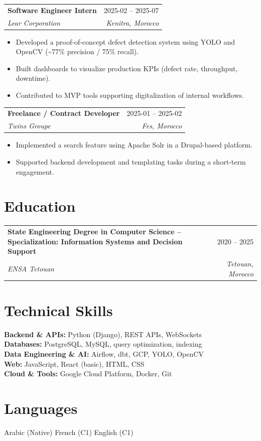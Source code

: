 \documentclass[11pt,a4paper]{article}
\makeatletter
\newcommand{\resumeEntry}[4]{
\begin{tabularx}{\textwidth}{@{}Xr@{}}
\textbf{#1} & #2 \\
\textit{#3} & \textit{#4} \\
\end{tabularx}
\vspace{-3pt}
}
\makeatother
\begin{document}
\resumeEntry
{Software Engineer Intern}
{2025-02 -- 2025-07}
{Lear Corporation}
{Kenitra, Morocco}

\begin{itemize}
  \item Developed a proof-of-concept defect detection system using YOLO and OpenCV (\textasciitilde77\% precision / 75\% recall).
  \item Built dashboards to visualize production KPIs (defect rate, throughput, downtime).
  \item Contributed to MVP tools supporting digitalization of internal workflows.
\end{itemize}

\resumeEntry
{Freelance / Contract Developer}
{2025-01 -- 2025-02}
{Twins Groupe}
{Fes, Morocco}

\begin{itemize}
  \item Implemented a search feature using Apache Solr in a Drupal-based platform.
  \item Supported backend development and templating tasks during a short-term engagement.
\end{itemize}

\section*{Education}

\resumeEntry
{State Engineering Degree in Computer Science -- Specialization: Information Systems and Decision Support}
{2020 -- 2025}
{ENSA Tetouan}
{Tetouan, Morocco}

\section*{Technical Skills}

\textbf{Backend \& APIs:} Python (Django), REST APIs, WebSockets \\
\textbf{Databases:} PostgreSQL, MySQL, query optimization, indexing \\
\textbf{Data Engineering \& AI:} Airflow, dbt, GCP, YOLO, OpenCV \\
\textbf{Web:} JavaScript, React (basic), HTML, CSS \\
\textbf{Cloud \& Tools:} Google Cloud Platform, Docker, Git

\section*{Languages}

Arabic (Native) \quad French (C1) \quad English (C1)
\end{document}

